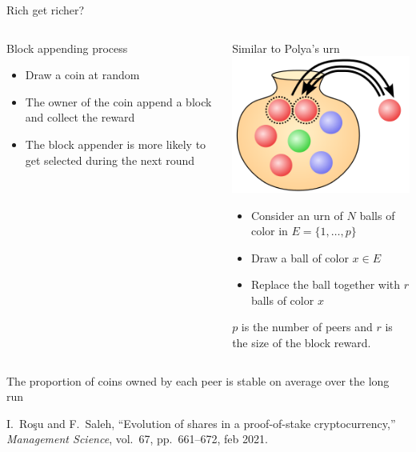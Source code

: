 \documentclass{beamer}
\begin{document}
\begin{frame}{Rich get richer?}
\scriptsize
\begin{columns}
\begin{column}{0.5\textwidth}
Block appending process
\begin{itemize}
  \item Draw a coin at random
  \item The owner of the coin append a block and collect the reward
  \item The block appender is more likely to get selected during the next round
\end{itemize}
\end{column}
\begin{column}{0.5\textwidth}
Similar to Polya's urn \includegraphics[scale=0.1]{../../Figures/poly_urn.png}
\begin{itemize}
  \item Consider an urn of $N$ balls of color in $E=\{1,\ldots, p\}$
  \item Draw a ball of color $x\in E$
  \item Replace the ball together with $r$ balls of color $x$ 
\end{itemize}
$p$ is the number of peers and $r$ is the size of the block reward. 
\end{column}
\end{columns}
\begin{tcolorbox}[enhanced,drop shadow, title=Theorem]
The proportion of coins owned by each peer is stable on average over the long run
\end{tcolorbox}

\tiny
\begin{thebibliography}{1}

I.~Ro{\c{s}}u and F.~Saleh, ``Evolution of shares in a proof-of-stake
  cryptocurrency,'' {\em Management Science}, vol.~67, pp.~661--672, feb 2021.
  \end{thebibliography}
\end{frame}
\end{document}
